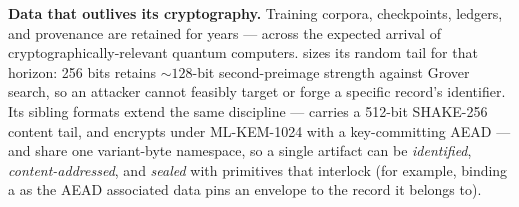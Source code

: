 \textbf{Data that outlives its cryptography.} Training corpora, checkpoints, ledgers, and provenance are retained for years --- across the expected arrival of cryptographically-relevant quantum computers. \tesseraid{} sizes its random tail for that horizon: 256 bits retains ${\sim}128$-bit second-preimage strength against Grover search, so an attacker cannot feasibly target or forge a specific record's identifier. Its sibling formats extend the same discipline --- \tesserahash{} carries a 512-bit SHAKE-256 content tail, and \tesseraseal{} encrypts under ML-KEM-1024 with a key-committing AEAD --- and share one variant-byte namespace, so a single artifact can be \emph{identified}, \emph{content-addressed}, and \emph{sealed} with primitives that interlock (for example, binding a \tesseraid{} as the AEAD associated data pins an envelope to the record it belongs to).
